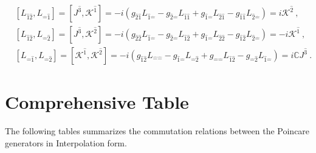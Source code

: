 \documentclass[12pt,a4paper]{report}
\begin{document}
\begin{align*}
    &\left[L_{\hat{1}\hat{2}},L_{\hat{-}\hat{1}}\right]=\left[J^{\hat{3}},\mathcal{K}^{\hat{1}}\right]=-i\left(g_{\hat{2}\hat{1}}L_{\hat{1}\hat{-}}-g_{\hat{2}\hat{-}}L_{\hat{1}\hat{1}}+g_{\hat{1}\hat{-}}L_{\hat{2}\hat{1}}-g_{\hat{1}\hat{1}}L_{\hat{2}\hat{-}}\right)=i\mathcal{K}^{\hat{2}}~,\\
    &\left[L_{\hat{1}\hat{2}},L_{\hat{-}\hat{2}}\right]=\left[J^{\hat{3}},\mathcal{K}^{\hat{2}}\right]=-i\left(g_{\hat{2}\hat{2}}L_{\hat{1}\hat{-}}-g_{\hat{2}\hat{-}}L_{\hat{1}\hat{2}}+g_{\hat{1}\hat{-}}L_{\hat{2}\hat{2}}-g_{\hat{1}\hat{2}}L_{\hat{2}\hat{-}}\right)=-i\mathcal{K}^{\hat{1}}~,\\
    &\left[L_{\hat{-}\hat{1}},L_{\hat{-}\hat{2}}\right]=\left[\mathcal{K}^{\hat{1}},\mathcal{K}^{\hat{2}}\right]=-i\left(g_{\hat{1}\hat{2}}L_{\hat{-}\hat{-}}-g_{\hat{1}\hat{-}}L_{\hat{-}\hat{2}}+g_{\hat{-}\hat{-}}L_{\hat{1}\hat{2}}-g_{\hat{-}\hat{2}}L_{\hat{1}\hat{-}}\right)=i\mathbb{C}J^{\hat{3}}~.
\end{align*}
\section{Comprehensive Table}
The following tables summarizes the commutation
relations between the Poincare generators in Interpolation form.
\end{document}

